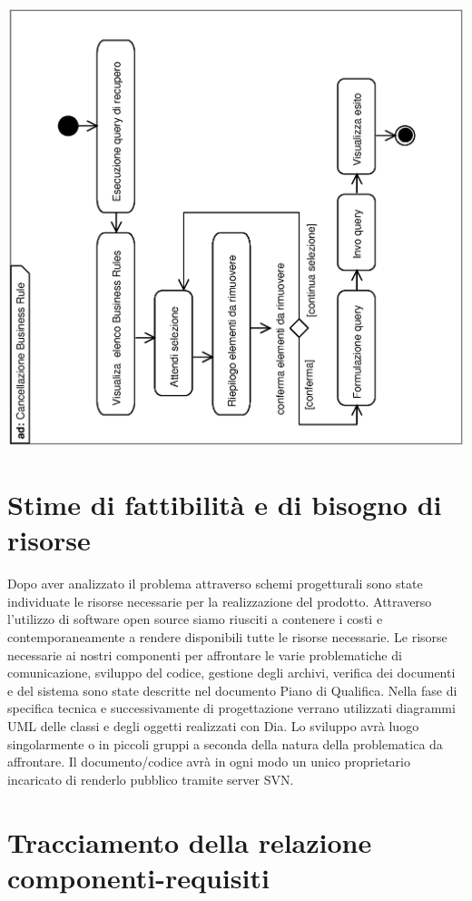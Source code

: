 \documentclass[11pt,titlepage,a4paper]{report}
\begin{document}
\begin{center}
 \includegraphics[width=1\textwidth, angle=-90]{CancellazioneBusinessRule.eps}
\end{center}


\chapter{Stime di fattibilit\`a e di bisogno di risorse}
Dopo aver analizzato il problema attraverso schemi progetturali sono state individuate le risorse necessarie  per la realizzazione del prodotto. Attraverso l'utilizzo di software open source siamo riusciti a contenere i costi e contemporaneamente a rendere disponibili tutte le risorse necessarie.
Le risorse necessarie ai nostri componenti per affrontare le varie problematiche di comunicazione, sviluppo del codice, gestione degli archivi, verifica dei documenti e del sistema sono state descritte nel documento Piano di Qualifica. Nella fase di specifica tecnica e successivamente di progettazione verrano utilizzati diagrammi UML delle classi e degli oggetti realizzati con Dia. Lo sviluppo avr\`a luogo singolarmente o in piccoli gruppi a seconda della natura della problematica da affrontare. Il documento/codice avr\`a in ogni modo un unico proprietario incaricato di renderlo pubblico tramite server SVN.
\chapter{Tracciamento della relazione componenti-requisiti}
\end{document}
